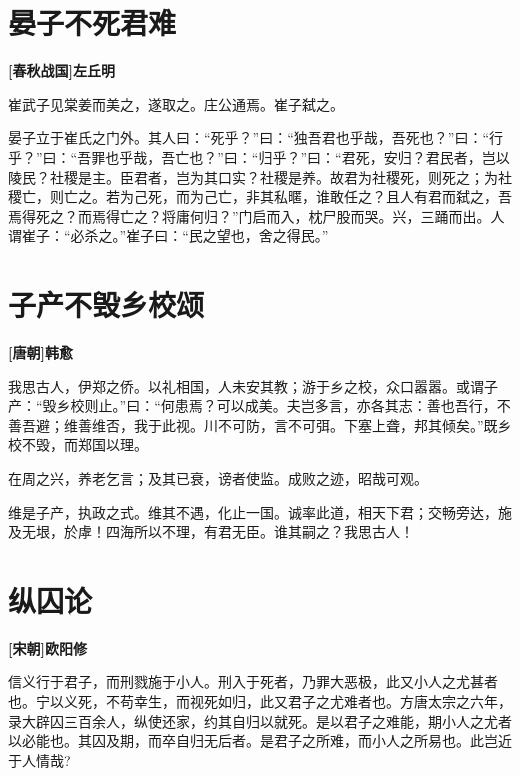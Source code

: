 \documentclass[UTF8,titlepage,oneside]{ctexbook}
\begin{document}
\chapter*{晏子不死君难}
\begin{center}
	\textbf{[春秋战国]左丘明}
\end{center}


崔武子见棠姜而美之，遂取之。庄公通焉。崔子弑之。


晏子立于崔氏之门外。其人曰：“死乎？”曰：“独吾君也乎哉，吾死也？”曰：“行乎？”曰：“吾罪也乎哉，吾亡也？”曰：“归乎？”曰：“君死，安归？君民者，岂以陵民？社稷是主。臣君者，岂为其口实？社稷是养。故君为社稷死，则死之；为社稷亡，则亡之。若为己死，而为己亡，非其私暱，谁敢任之？且人有君而弑之，吾焉得死之？而焉得亡之？将庸何归？”门启而入，枕尸股而哭。兴，三踊而出。人谓崔子：“必杀之。”崔子曰：“民之望也，舍之得民。”



\chapter*{子产不毁乡校颂}
\begin{center}
	\textbf{[唐朝]韩愈}
\end{center}

我思古人，伊郑之侨。以礼相国，人未安其教；游于乡之校，众口嚣嚣。或谓子产：“毁乡校则止。”曰：“何患焉？可以成美。夫岂多言，亦各其志：善也吾行，不善吾避；维善维否，我于此视。川不可防，言不可弭。下塞上聋，邦其倾矣。”既乡校不毁，而郑国以理。

在周之兴，养老乞言；及其已衰，谤者使监。成败之迹，昭哉可观。

维是子产，执政之式。维其不遇，化止一国。诚率此道，相天下君；交畅旁达，施及无垠，於虖！四海所以不理，有君无臣。谁其嗣之？我思古人！


\chapter*{纵囚论}
\begin{center}
	\textbf{[宋朝]欧阳修}
\end{center}


信义行于君子，而刑戮施于小人。刑入于死者，乃罪大恶极，此又小人之尤甚者也。宁以义死，不苟幸生，而视死如归，此又君子之尤难者也。方唐太宗之六年，录大辟囚三百余人，纵使还家，约其自归以就死。是以君子之难能，期小人之尤者以必能也。其囚及期，而卒自归无后者。是君子之所难，而小人之所易也。此岂近于人情哉?
\end{document}
